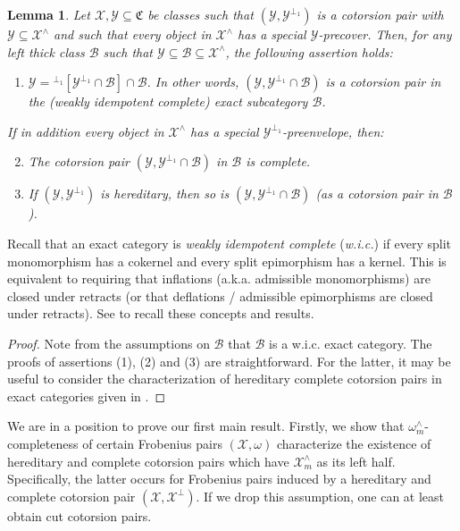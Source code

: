 \documentclass[10pt,reqno]{amsart}
\numberwithin{equation}{section}
\newtheorem{lemma}[definition]{Lemma}
\theoremstyle{remark}
\newcommand{\B}{\mathcal{B}}
\newcommand{\X}{\mathcal{X}}
\newcommand{\Y}{\mathcal{Y}}
\begin{document}
\begin{lemma} \label{RK-H-C2}
Let $\X, \Y \subseteq \mathfrak{C}$ be classes such that $(\Y, \Y ^{\perp_1})$ is a cotorsion pair with $\Y \subseteq \X ^{\wedge}$ and such that every object in $\X^{\wedge}$ has a special $\Y$-precover. Then, for any left thick class $\mathcal{B}$ such that $\Y \subseteq \mathcal{B} \subseteq \X^{\wedge}$, the following assertion holds:
\begin{enumerate}[(1)]
\item $\Y = {}^{\perp_1}[\Y^{\perp _1} \cap \B] \cap \B$. In other words, $(\Y, \Y^{\perp _1} \cap \B)$ is a cotorsion pair in the (weakly idempotent complete) exact subcategory $\mathcal{B}$.
\end{enumerate}
If in addition every object in $\X^{\wedge}$ has a special $\Y ^{\perp _1}$-preenvelope, then:
\begin{enumerate}[(1)]
\setcounter{enumi}{1}
\item The cotorsion pair $(\Y, \Y^{\perp _1} \cap \B)$ in $\mathcal{B}$ is complete.

\item If $(\Y, \Y^{\perp_1})$ is hereditary, then so is $(\Y, \Y^{\perp_1} \cap \B)$ (as a cotorsion pair in $\mathcal{B}$). \\
\end{enumerate}
\end{lemma}


Recall that an exact category is \emph{weakly idempotent complete} (\emph{w.i.c.}) if every split monomorphism has a cokernel and every split epimorphism has a kernel. This is equivalent to requiring that inflations (a.k.a. admissible monomorphisms) are closed under retracts (or that deflations / admissible epimorphisms are closed under retracts). See \cite[Prop. 2.4]{GillespieExact} to recall these concepts and results.


\begin{proof}
Note from the assumptions on $\mathcal{B}$ that $\mathcal{B}$ is a w.i.c. exact category. The proofs of assertions (1), (2) and (3) are straightforward. For the latter, it may be useful to consider the characterization of hereditary complete cotorsion pairs in exact categories given in \cite[Lem. 6.17]{Stovi14}. 
\end{proof}


We are in a position to prove our first main result. Firstly, we show that $\omega^{\wedge}_m$-completeness of certain  Frobenius pairs $(\mathcal{X},\omega)$ characterize the existence of hereditary and complete cotorsion pairs which have $\X^{\wedge} _m$ as its left half. Specifically, the latter occurs for Frobenius pairs induced by a hereditary and complete cotorsion pair $(\mathcal{X},\mathcal{X}^{\perp})$. If we drop this assumption, one can at least obtain cut cotorsion pairs. 
\end{document}
